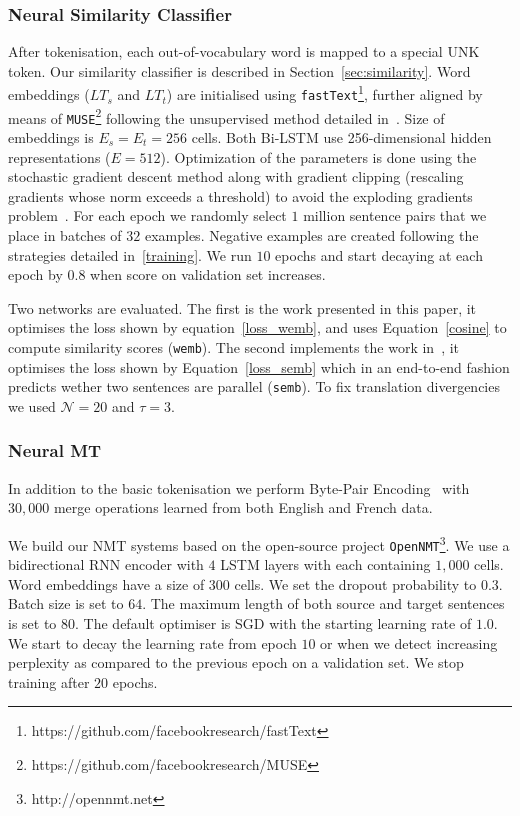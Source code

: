 \documentclass[11pt,a4paper]{article}
\begin{document}
\subsubsection{Neural Similarity Classifier}
\label{divergence}

After tokenisation, each out-of-vocabulary word is mapped to a special UNK token.
Our similarity classifier is described in Section~\ref{sec:similarity}. 
Word embeddings ($LT_s$ and $LT_t$) are initialised using \texttt{fastText}\footnote{https://github.com/facebookresearch/fastText}, further aligned by means of \texttt{MUSE}\footnote{https://github.com/facebookresearch/MUSE} following the unsupervised method detailed in~\cite{lample2018word}. 
Size of embeddings is $E_s=E_t=256$ cells. 
Both Bi-LSTM use 256-dimensional hidden representations ($E=512$). 
Optimization of the parameters is done using the stochastic gradient descent method along with gradient clipping (rescaling gradients whose norm exceeds a threshold) to avoid the exploding gradients problem~\cite{Pascanu:2013:DTR:3042817.3043083}. 
For each epoch we randomly select $1$ million sentence pairs that we place in batches of $32$ examples.  
Negative examples are created following the strategies detailed in~\ref{training}.%
We run $10$ epochs and start decaying at each epoch by $0.8$ when score on validation set increases. 

Two networks are evaluated. 
The first is the work presented in this paper, it optimises the loss shown by equation~\ref{loss_wemb}, and uses Equation~\ref{cosine} to compute similarity scores (\texttt{wemb}).
The second implements the work in~\cite{W17-2509}, it optimises the loss shown by Equation~\ref{loss_semb} which in an end-to-end fashion predicts wether two sentences are parallel (\texttt{semb}).
To fix translation divergencies we used $\mathcal{N}=20$ and $\tau=3$.

\subsubsection{Neural MT}
\label{translation}

In addition to the basic tokenisation we perform Byte-Pair Encoding~\cite{Sennrich2016} with $30,000$ merge operations learned from both English and French data.

We build our NMT systems based on the open-source project \texttt{OpenNMT}\footnote{http://opennmt.net}. We use a bidirectional RNN encoder with $4$ LSTM layers with each containing $1,000$ cells. Word embeddings have a size of $300$ cells. We set the dropout probability to $0.3$. Batch size is set to $64$. The maximum length of both source and target sentences is set to $80$. %
The default optimiser is SGD with the starting learning rate of $1.0$. We start to decay the learning rate from epoch $10$ or when we detect increasing perplexity as compared to the previous epoch on a validation set. We stop training after $20$ epochs.
\end{document}
